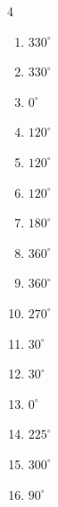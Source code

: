 \begin{multicols}{4}
\begin{enumerate}
  \item $\displaystyle 330^{\circ}$

  \item $\displaystyle 330^{\circ}$

  \item $\displaystyle 0^{\circ}$
        \phantom{$\displaystyle =0$}

  \item $\displaystyle 120^{\circ}$

  \item $\displaystyle 120^{\circ}$

  \item $\displaystyle 120^{\circ}$

\columnbreak %

\resetques

  \item $\displaystyle 180^{\circ}$
        \phantom{$\displaystyle =\pi$}

  \item $\displaystyle 360^{\circ}$
        \phantom{$\displaystyle =2\pi$}

  \item $\displaystyle 360^{\circ}$
        \phantom{$\displaystyle =2\pi$}

  \item $\displaystyle 270^{\circ}$

  \item $\displaystyle 30^{\circ}$

  \item $\displaystyle 30^{\circ}$

  \item $\displaystyle 0^{\circ}$
        \phantom{$\displaystyle =0$}

  \item $\displaystyle 225^{\circ}$

  \item $\displaystyle 300^{\circ}$

  \item $\displaystyle 90^{\circ}$


\end{enumerate}
\end{multicols}

